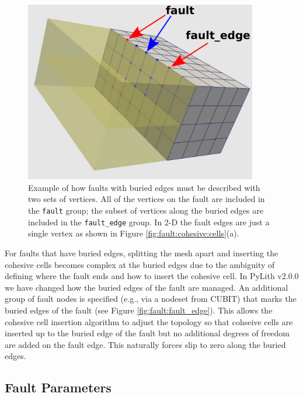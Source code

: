\begin{figure}[htbp]
  \includegraphics[width=4in]{physics/figs/faultEdge}
  \caption{Example of how faults with buried edges must be described
    with two sets of vertices. All of the vertices on the fault are
    included in the \texttt{fault} group; the subset of vertices along
    the buried edges are included in the \texttt{fault\_edge}
    group. In 2-D the fault edges are just a single vertex as shown in
    Figure
    \vref{fig:fault:cohesive:cells}(a).}
  \label{fig:fault:fault_edge}
\end{figure}
For faults that have buried edges, splitting the mesh apart and inserting
the cohesive cells becomes complex at the buried edges due to the
ambiguity of defining where the fault ends and how to insert the cohesive
cell. In PyLith v2.0.0 we have changed how the buried edges of the
fault are managed. An additional group of fault nodes is specified
(e.g., via a nodeset from CUBIT) that marks the buried edges of the
fault (see Figure \vref{fig:fault:fault_edge}). This allows the cohesive
cell insertion algorithm to adjust the topology so that cohseive cells
are inserted up to the buried edge of the fault but no additional
degrees of freedom are added on the fault edge. This naturally forces
slip to zero along the buried edges.

\subsection{Fault Parameters}

